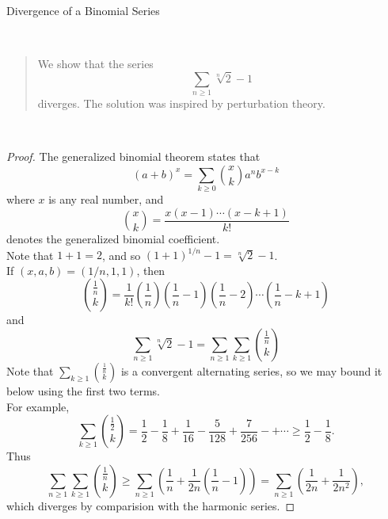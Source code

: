 \documentclass[12pt]{memoir}
\newcommand{\ud}[1]{\frac{1}{#1}}
\def\br{~\\[1em]}
\begin{document}
~\\[-1em]
\begin{center}
\LARGE Divergence of a Binomial Series
\end{center}
~\\[-1em]
\begin{abstract}
\noindent We show that the series
\[\sum_{n\ge 1}\sqrt[n]2 - 1\]
diverges. The solution was inspired by perturbation theory.
\end{abstract}
~\\[-1em]
\begin{proof}
The generalized binomial theorem states that
\[(a + b)^x = \sum_{k\ge 0}{x\choose k}a^nb^{x - k}\]
where $x$ is any real number, and
\[{x\choose k} = \frac{x(x - 1)\cdots(x - k + 1)}{k!}\]
denotes the generalized binomial coefficient.
\br
Note that $1 + 1 = 2$, and so $(1 + 1)^{1/n} - 1 = \sqrt[n]2 - 1$.
\br
If $(x, a, b) = (1/n, 1, 1)$, then
\[{\ud n\choose k}
= \ud{k!}\left(\ud n\right)\left(\ud n - 1\right)
\left(\ud n - 2\right)\cdots \left(\ud n - k + 1\right)\]
and
\[\sum_{n\ge 1}\sqrt[n]2 - 1
= \sum_{n\ge 1}\sum_{k\ge 1}{\ud n\choose k}\]
Note that $\sum_{k\ge 1}{\ud n\choose k}$
is a convergent alternating series,
so we may bound it below using the first two terms.
\br
For example,
\[\sum_{k\ge 1}{\ud 2\choose k}
= \ud 2 - \ud 8 + \ud{16} - \frac{5}{128}
+ \frac{7}{256} -+\cdots\ge \ud 2 - \ud 8.\]
Thus
\[\sum_{n\ge 1}\sum_{k\ge 1}{\ud n\choose k}
\ge\sum_{n\ge 1}\left(\ud n + \ud{2n}\left(\ud n - 1\right)\right)
= \sum_{n\ge 1}\left(\ud{2n} + \ud{2n^2}\right),\]
which diverges by comparision with the harmonic series.
\end{proof}
\end{document}

